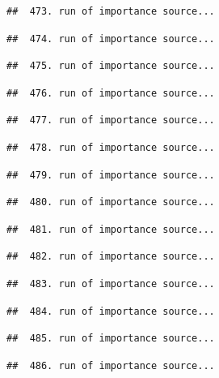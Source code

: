 \documentclass[
]{article}
\begin{document}
\begin{verbatim}
##  473. run of importance source...
\end{verbatim}

\begin{verbatim}
##  474. run of importance source...
\end{verbatim}

\begin{verbatim}
##  475. run of importance source...
\end{verbatim}

\begin{verbatim}
##  476. run of importance source...
\end{verbatim}

\begin{verbatim}
##  477. run of importance source...
\end{verbatim}

\begin{verbatim}
##  478. run of importance source...
\end{verbatim}

\begin{verbatim}
##  479. run of importance source...
\end{verbatim}

\begin{verbatim}
##  480. run of importance source...
\end{verbatim}

\begin{verbatim}
##  481. run of importance source...
\end{verbatim}

\begin{verbatim}
##  482. run of importance source...
\end{verbatim}

\begin{verbatim}
##  483. run of importance source...
\end{verbatim}

\begin{verbatim}
##  484. run of importance source...
\end{verbatim}

\begin{verbatim}
##  485. run of importance source...
\end{verbatim}

\begin{verbatim}
##  486. run of importance source...
\end{verbatim}
\end{document}
